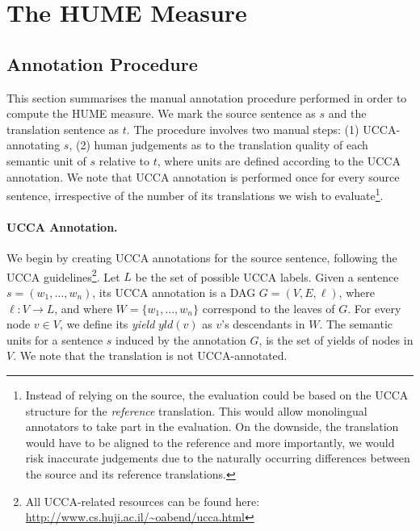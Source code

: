 \documentclass[11pt]{article}
\begin{document}


\section{The HUME Measure}\label{sec:hume}


\subsection{Annotation Procedure}\label{sec:guidelines}

This section summarises the manual annotation procedure performed in order 
to compute the HUME measure. 
We mark the source sentence as $s$ and the translation sentence as $t$. 
The procedure involves two manual steps: (1) UCCA-annotating $s$, 
(2) human judgements as to the translation quality of each semantic unit of $s$ relative to $t$,
where units are defined according to the UCCA annotation.
We note that UCCA annotation is performed once for every source sentence,
irrespective of the number of its translations we wish
to evaluate\footnote{Instead of relying on the source,
the evaluation could be based on the UCCA structure for the \emph{reference}
translation. This would allow monolingual annotators to take part in the
evaluation. On the downside, the translation would have to be aligned to the
reference and more importantly, we would risk inaccurate judgements due to
the naturally occurring differences between the source and its reference
translations.}.

\paragraph{UCCA Annotation.}
We begin by creating UCCA annotations for the source sentence, following the
UCCA guidelines\footnote{All UCCA-related resources can be found
  here: \url{http://www.cs.huji.ac.il/~oabend/ucca.html}}.
Let $L$ be the set of possible UCCA labels.
Given a sentence $s = (w_1, \ldots,w_n)$, its UCCA annotation is a DAG $G=(V,E,\ell)$,
where $\ell: V \rightarrow L$, and where $W = \{w_1,\ldots,w_n\}$ correspond to the leaves of $G$.
For every node $v \in V$, we define its {\it yield} $yld(v)$ as $v$'s descendants in $W$.
The semantic units for a sentence $s$ induced by the annotation $G$,
is the set of yields of nodes in $V$. %
We note that the translation is not UCCA-annotated.
\end{document}

